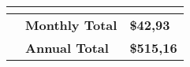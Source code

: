 \begin{adjustbox}{angle=90}
\begin{tabularx}{\textheight}{|l||X|m{4cm}|}
            \multicolumn{3}{|l|}{}                \\ \hline\hline
                                                       & \textbf{Monthly Total}                                                                                                                                                                                                                           & \textbf{\$42,93}                         \\ \hline
                                                       & \textbf{Annual Total}                                                                                                                                                                                                                            & \textbf{\$515,16}                        \\ \hline

                \end{tabularx}
                \label{azPriceT1_1}
\end{adjustbox}